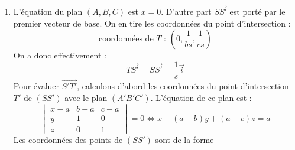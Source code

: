 \begin{enumerate}
\begin{multline*}
\begin{aligned}
{\begin{vmatrix}
 a+b & a \\
a & a
\end{vmatrix}
}
{\begin{vmatrix}
 a+b & a \\
a & a+c
\end{vmatrix}
} 
\end{aligned}
\right.
\Leftrightarrow
\left\lbrace 
\begin{aligned}
 x=& \dfrac{2abc}{ab+ac+bc} \\
y =&  \dfrac{ac}{ab+ac+bc}\\
z =& \dfrac{ab}{ab+ac+bc}
\end{aligned}
\right. 
 \end{multline*}
Comme d'autre part
\begin{displaymath}
 s=\dfrac{1}{a}+\dfrac{1}{b}+\dfrac{1}{c}=\dfrac{ab+ac+bc}{abc}
\end{displaymath}
On obtient finalement :
\begin{displaymath}
 \text{coordonnées de $S'$ : } \left( \dfrac{2}{s} , \dfrac{1}{bs} , \dfrac{1}{cs}\right) 
\end{displaymath}
Les droites $(AA')$ et $(SS')$ sont parallèles car les vecteurs $\overrightarrow{AA'}= a\overrightarrow i$ et $\overrightarrow{SS'}=\frac{1}{s}\overrightarrow i$ sont colinéaires 
\item L'équation du plan $(A,B,C)$ est $x=0$. D'autre part $\overrightarrow{SS'}$ est porté par le premier vecteur de base. On en tire les coordonnées du point d'intersection :
\begin{displaymath}
 \text{coordonnées de $T$ : } \left( 0, \dfrac{1}{bs}, \dfrac{1}{cs}\right) 
\end{displaymath}
On a donc effectivement :
\begin{displaymath}
 \overrightarrow{TS'}=\overrightarrow{SS'}=\dfrac{1}{s}\overrightarrow{i}
\end{displaymath}
Pour évaluer $\overrightarrow{S'T'}$, calculons d'abord les coordonnées du point d'intersection $T'$ de $(SS')$ avec le plan $(A'B'C')$. L'équation de ce plan est :
\begin{displaymath}
 \begin{vmatrix}
  x-a & b-a & c-a \\
y & 1 & 0 \\
z & 0 & 1
 \end{vmatrix}
=0 \Leftrightarrow 
x + (a-b)y +(a-c)z = a
\end{displaymath}
Les coordonnées des points de $(SS')$ sont de la forme
\begin{displaymath}

\end{displaymath}
\end{enumerate}
